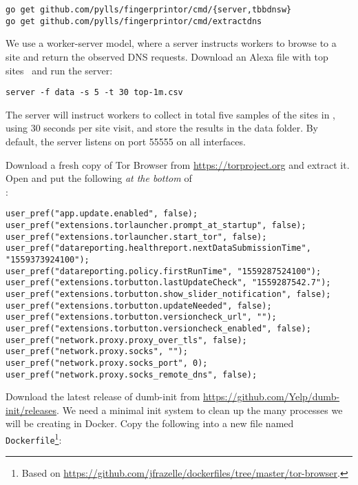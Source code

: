 \documentclass{article}
\begin{document}
\begin{lstlisting}
go get github.com/pylls/fingerprintor/cmd/{server,tbbdnsw}
go get github.com/pylls/fingerprintor/cmd/extractdns
\end{lstlisting}

We use a worker-server model, where a server instructs workers to browse to a
site and return the observed DNS requests. Download an Alexa file with top
sites~\cite{alexatop1k} and run the server:

\begin{lstlisting}
server -f data -s 5 -t 30 top-1m.csv
\end{lstlisting}
The server will instruct workers to collect in total
five samples of the sites in , using 30 seconds per site visit,
and store the results in the data folder. By default, the server listens on
port 55555 on all interfaces.

Download a fresh copy of Tor Browser from \url{https://torproject.org} and extract it.
Open 
and put the
following \emph{at the bottom} of\\ :

\begin{lstlisting}
user_pref("app.update.enabled", false);
user_pref("extensions.torlauncher.prompt_at_startup", false);
user_pref("extensions.torlauncher.start_tor", false);
user_pref("datareporting.healthreport.nextDataSubmissionTime", "1559373924100");
user_pref("datareporting.policy.firstRunTime", "1559287524100");
user_pref("extensions.torbutton.lastUpdateCheck", "1559287542.7");
user_pref("extensions.torbutton.show_slider_notification", false);
user_pref("extensions.torbutton.updateNeeded", false);
user_pref("extensions.torbutton.versioncheck_url", "");
user_pref("extensions.torbutton.versioncheck_enabled", false);
user_pref("network.proxy.proxy_over_tls", false);
user_pref("network.proxy.socks", "");
user_pref("network.proxy.socks_port", 0);
user_pref("network.proxy.socks_remote_dns", false);
\end{lstlisting}

Download the latest release of dumb-init from
\url{https://github.com/Yelp/dumb-init/releases}. We need a minimal init system
to clean up the many processes we will be creating in Docker.
Copy the following into a
new file named \texttt{Dockerfile}\footnote{Based on
\url{https://github.com/jfrazelle/dockerfiles/tree/master/tor-browser}.}:
\end{document}
